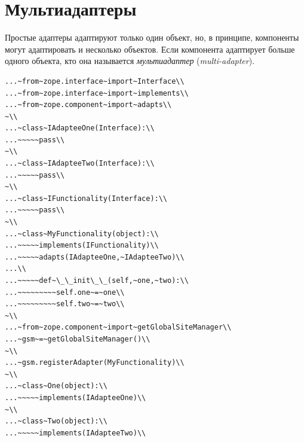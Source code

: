 \documentclass[a4paper,openany,twoside,draft]{book}
\providecommand*{\DUroletitlereference}[1]{\textsl{#1}}
\begin{document}
\section{Мультиадаптеры%
  \label{id45}%
}

Простые адаптеры адаптируют только один объект, но, в принципе,
компоненты могут адаптировать и несколько объектов.  Если компонента
адаптирует больше одного объекта, кто она называется \DUroletitlereference{мультиадаптер}
(\DUroletitlereference{multi-adapter}).

\begin{verbatim}
...~from~zope.interface~import~Interface\\
...~from~zope.interface~import~implements\\
...~from~zope.component~import~adapts\\
~\\
...~class~IAdapteeOne(Interface):\\
...~~~~~pass\\
~\\
...~class~IAdapteeTwo(Interface):\\
...~~~~~pass\\
~\\
...~class~IFunctionality(Interface):\\
...~~~~~pass\\
~\\
...~class~MyFunctionality(object):\\
...~~~~~implements(IFunctionality)\\
...~~~~~adapts(IAdapteeOne,~IAdapteeTwo)\\
...\\
...~~~~~def~\_\_init\_\_(self,~one,~two):\\
...~~~~~~~~~self.one~=~one\\
...~~~~~~~~~self.two~=~two\\
~\\
...~from~zope.component~import~getGlobalSiteManager\\
...~gsm~=~getGlobalSiteManager()\\
~\\
...~gsm.registerAdapter(MyFunctionality)\\
~\\
...~class~One(object):\\
...~~~~~implements(IAdapteeOne)\\
~\\
...~class~Two(object):\\
...~~~~~implements(IAdapteeTwo)\\

\end{verbatim}
\end{document}
